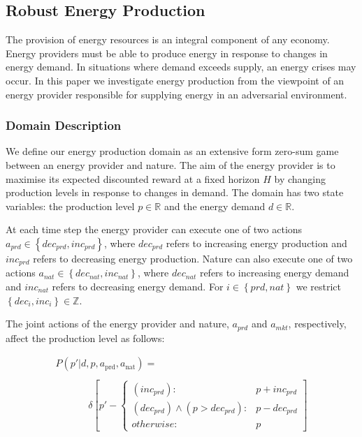 \subsection{Robust Energy Production}

The provision of energy resources is an integral component of any
economy. Energy providers must be able to produce energy in response
to changes in energy demand. In situations where demand exceeds supply,
an energy crises may occur. In this paper we investigate energy 
production from the viewpoint of an energy provider responsible for 
supplying energy in an adversarial environment.

\subsubsection{Domain Description}

We define our energy production domain as an extensive form zero-sum
game between an energy provider and nature. The aim of the energy
provider is to maximise its expected discounted reward at a 
fixed horizon $H$ by changing production levels in response to changes in demand.
The domain has two state variables: the production level $p \in \mathbb{R}$ and the energy demand
$d \in \mathbb{R}$. 

At each time step the energy provider can execute one of two actions
$a_{prd} \in \left\{dec_{prd}, inc_{prd}\right\}$, where $dec_{prd}$ 
refers to increasing energy production and $inc_{prd}$ refers to decreasing
energy production. Nature can also execute one of two actions
$a_{nat} \in \left\{dec_{nat}, inc_{nat}\right\}$, where $dec_{nat}$ 
refers to increasing energy demand and $inc_{nat}$ refers to decreasing
energy demand. For $i \in \left\{prd, nat\right\}$ we restrict 
$\left\{dec_i, inc_i\right\} \in \mathbb{Z}$.

The joint actions of the energy provider and nature, $a_{prd}$ and
$a_{mkt}$, respectively, affect the production level as follows:

{\small 
\abovedisplayskip=0pt
\belowdisplayskip=0pt
\begin{align*}
&P(p' | d, p, a_{\text{prd}}, a_{\text{nat}}) = \\
\\
& \hspace{40pt} \delta \left[ p' - \begin{cases}
      (inc_{prd})  : & p + inc_{prd} \\
       (dec_{prd}) \wedge (p > dec_{prd}): & p - dec_{prd} \\
      otherwise: & p
    \end{cases} \right] & \\    
\end{align*}
}%

